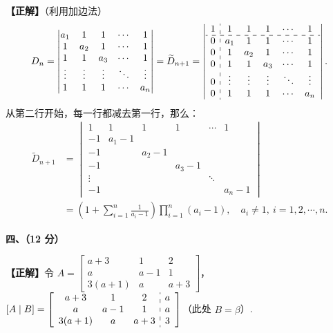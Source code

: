 \documentclass[a4paper,11pt]{ctexart}
\begin{document}
\textbf{【正解】}（利用加边法）
\[
  D_n = \begin{vmatrix}
    a_1 & 1 & 1 & \cdots & 1 \\
    1 & a_2 & 1 & \cdots & 1 \\
    1 & 1 & a_3 & \cdots & 1 \\
    \vdots & \vdots & \vdots & \ddots & \vdots \\
    1 & 1 & 1 & \cdots & a_n
  \end{vmatrix}
  = \widetilde{D}_{n+1}
  = \left|\begin{array}{c:ccccc}
    1 & 1 & 1 & 1 & \cdots & 1 \\ \hdashline
    0 & a_1 & 1 & 1 & \cdots & 1 \\
    0 & 1 & a_2 & 1 & \cdots & 1 \\
    0 & 1 & 1 & a_3 & \cdots & 1 \\
    0 & \vdots & \vdots & \vdots & \ddots & \vdots \\
    0 & 1 & 1 & 1 & \cdots & a_n
  \end{array}\right|.
\]
从第二行开始，每一行都减去第一行，那么：
\begin{align*}
  \widetilde{D}_{n+1} &= \begin{vmatrix}
    1 & 1 & 1 & 1 & \cdots & 1 \\
    -1 & a_1 - 1 & & & & \\
    -1 & & a_2 - 1 & & & \\
    -1 & & & a_3 - 1 & & \\
    \vdots & & & & \ddots & \\
    -1 & & & & & a_n - 1
  \end{vmatrix} \\
  &= \left(1 + \sum_{i=1}^n \frac{1}{a_i - 1}\right) \prod_{i=1}^n (a_i - 1),\quad a_i \neq 1,\ i = 1, 2, \cdots, n.
\end{align*}

\vspace{0.8em}

\textbf{四、（12 分）}

\textbf{【正解】}令 $A = \begin{bmatrix} a + 3 & 1 & 2 \\ a & a - 1 & 1 \\ 3(a + 1) & a & a + 3 \end{bmatrix}$，$[A \mid B] = \left[\begin{array}{ccc:c} a + 3 & 1 & 2 & a \\ a & a - 1 & 1 & a \\ 3(a + 1) & a & a + 3 & 3 \end{array}\right]$（此处 $B = \beta$）.
\end{document}
